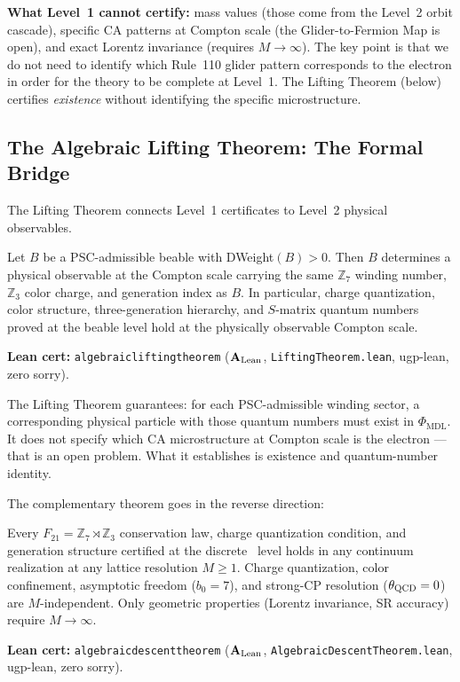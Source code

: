 \documentclass[11pt,openany]{book}
\theoremstyle{remark}
\newcommand{\PHIMDL}{\Phi_{\mathrm{MDL}}}
\newcommand{\ZS}{\mathbb{Z}_7}
\newcommand{\lean}[1]{%
  \penalty-100
  \begingroup\def\_{\textunderscore\allowbreak}\texttt{#1}\endgroup}
\newcommand{\CMCA}{\text{CMCA}}
\newcommand{\CatAL}{\ensuremath{\textbf{A}_{\rm Lean}}}
\begin{document}
\textbf{What Level~1 cannot certify:} mass values (those come from the Level~2 orbit cascade),
specific CA patterns at Compton scale (the Glider-to-Fermion Map is open), and exact
Lorentz invariance (requires $M\to\infty$).
The key point is that we do not need to identify which Rule~110 glider pattern
corresponds to the electron in order for the theory to be complete at Level~1.
The Lifting Theorem (below) certifies \emph{existence} without identifying the
specific microstructure.



\subsection*{The Algebraic Lifting Theorem: The Formal Bridge}

The Lifting Theorem connects Level~1 certificates to Level~2 physical observables.

\begin{tcolorbox}[colback=orange!5,colframe=orange!60,
  title={Theorem: Algebraic Lifting (\CatAL, zero sorry, zero axioms beyond CIC)}]
Let $B$ be a PSC-admissible beable with DWeight$(B) > 0$.
Then $B$ determines a physical observable at the Compton scale carrying the same
$\mathbb{Z}_7$ winding number, $\mathbb{Z}_3$ color charge, and generation index as $B$.
In particular, charge quantization, color structure, three-generation hierarchy, and
$S$-matrix quantum numbers proved at the beable level hold at the physically observable
Compton scale.

\smallskip\noindent
\textbf{Lean cert:} \lean{algebraic\_lifting\_theorem} (\CatAL, \texttt{LiftingTheorem.lean}, ugp-lean, zero sorry).
\end{tcolorbox}

The Lifting Theorem guarantees: for each PSC-admissible winding sector, a corresponding
physical particle with those quantum numbers must exist in $\PHIMDL$.
It does not specify which CA microstructure at Compton scale is the electron --- that is
an open problem.
What it establishes is existence and quantum-number identity.

The complementary theorem goes in the reverse direction:

\begin{tcolorbox}[colback=green!5,colframe=green!50!black,
  title={Theorem: Algebraic Descent (\CatAL, zero sorry)}]
Every $F_{21} = \ZS\rtimes\mathbb{Z}_3$ conservation law, charge quantization
condition, and generation structure certified at the discrete \CMCA\ level holds
in any continuum realization at any lattice resolution $M\geq 1$.
Charge quantization, color confinement, asymptotic freedom ($b_0=7$), and
strong-CP resolution ($\theta_{\rm QCD} = 0$) are $M$-independent.
Only geometric properties (Lorentz invariance, SR accuracy) require $M\to\infty$.

\smallskip\noindent
\textbf{Lean cert:} \lean{algebraic\_descent\_theorem} (\CatAL, \texttt{AlgebraicDescentTheorem.lean}, ugp-lean, zero sorry).
\end{tcolorbox}
\end{document}
